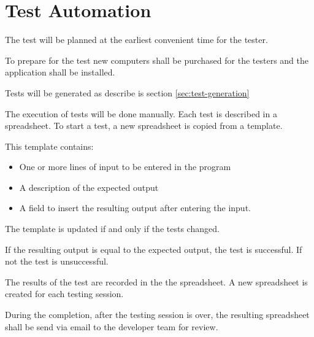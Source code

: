 \documentclass[11pt,a4paper]{article}
\begin{document}

\section{Test Automation}\label{sec:test-automation}

The test will be planned at the earliest convenient time for the
tester.

To prepare for the test new computers shall be purchased for the
testers and the application shall be installed.

Tests will be generated as describe is section \ref{sec:test-generation}

The execution of tests will be done manually. Each test is described
in a spreadsheet. To start a test, a new spreadsheet is copied from a
template.

This template contains:

\begin{itemize}
\item One or more lines of input to be entered in the program
\item A description of the expected output
\item A field to insert the resulting output after entering the input.
\end{itemize}

The template is updated if and only if the tests  changed.

If the resulting output is equal to the expected output, the test is
successful. If not the test is unsuccessful.

The results of the test are recorded in the the spreadsheet. A new
spreadsheet is created for each testing session.

During the completion, after the testing session is over, the resulting spreadsheet shall be
send via email to the developer team for review.

\end{document}
